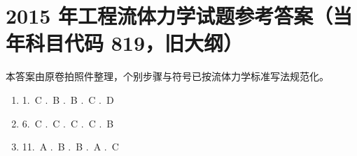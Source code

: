 \chapter{2015 年工程流体力学试题参考答案（当年科目代码 819，旧大纲）}

\begin{tishi}
本答案由原卷拍照件整理，个别步骤与符号已按流体力学标准写法规范化。
\end{tishi}


\begin{enumerate}[label={}]
  \item 1.~C .~B .~B .~C .~D
  \item 6.~C .~C .~C .~C .~B
  \item 11.~A .~B .~B .~A .~C
\end{enumerate}

